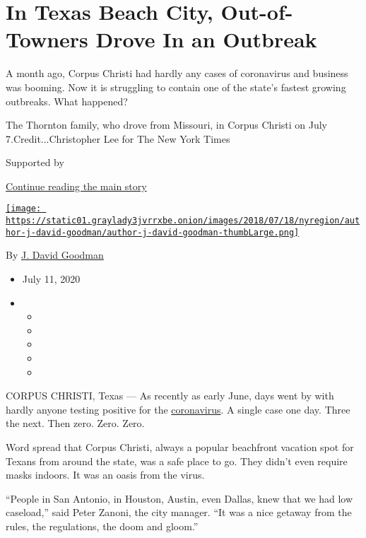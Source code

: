 \hypertarget{in-texas-beach-city-out-of-towners-drove-in-an-outbreak}{%
\section{In Texas Beach City, Out-of-Towners Drove In an
Outbreak}\label{in-texas-beach-city-out-of-towners-drove-in-an-outbreak}}

A month ago, Corpus Christi had hardly any cases of coronavirus and
business was booming. Now it is struggling to contain one of the state's
fastest growing outbreaks. What happened?

The Thornton family, who drove from Missouri, in Corpus Christi on July
7.Credit...Christopher Lee for The New York Times

Supported by

\protect\hyperlink{after-sponsor}{Continue reading the main story}

\href{https://www.nytimes3xbfgragh.onion/by/j-david-goodman}{\texttt{[image: https://static01.graylady3jvrrxbe.onion/images/2018/07/18/nyregion/author-j-david-goodman/author-j-david-goodman-thumbLarge.png]}}

By \href{https://www.nytimes3xbfgragh.onion/by/j-david-goodman}{J. David
Goodman}

\begin{itemize}
\item
  July 11, 2020
\item
  \begin{itemize}
  \item
  \item
  \item
  \item
  \item
  \end{itemize}
\end{itemize}

CORPUS CHRISTI, Texas --- As recently as early June, days went by with
hardly anyone testing positive for the
\href{https://www.nytimes3xbfgragh.onion/2020/07/26/us/coronavirus-family-houston-masks.html}{coronavirus}.
A single case one day. Three the next. Then zero. Zero. Zero.

Word spread that Corpus Christi, always a popular beachfront vacation
spot for Texans from around the state, was a safe place to go. They
didn't even require masks indoors. It was an oasis from the virus.

``People in San Antonio, in Houston, Austin, even Dallas, knew that we
had low caseload,'' said Peter Zanoni, the city manager. ``It was a nice
getaway from the rules, the regulations, the doom and gloom.''

